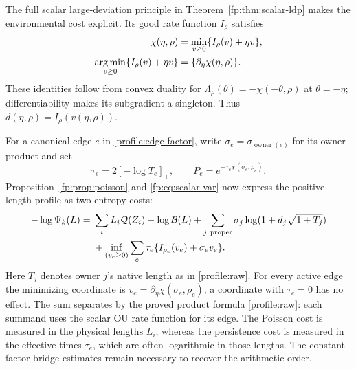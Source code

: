 The full scalar large-deviation principle in
Theorem~\ref{fp:thm:scalar-ldp} makes the environmental cost explicit.
Its good rate function $I_\rho$ satisfies
\begin{equation}\label{fp:eq:scalar-var}
 \begin{split}
 \chi(\eta,\rho)&=\min_{v\ge0}\{I_\rho(v)+\eta v\},\\
 \operatorname*{arg\,min}_{v\ge0}\{I_\rho(v)+\eta v\}
   &=\{\partial_\eta\chi(\eta,\rho)\}.
 \end{split}
\end{equation}
These identities follow from convex duality for
$\Lambda_\rho(\theta)=-\chi(-\theta,\rho)$ at $\theta=-\eta$;
differentiability makes its subgradient a singleton. Thus
$d(\eta,\rho)=I_\rho(v(\eta,\rho))$.

For a canonical edge $e$ in \eqref{profile:edge-factor}, write
$\sigma_e=\sigma_{\operatorname{owner}(e)}$ for its owner product and set
\begin{equation}\label{fp:eq:edge-clock}
 \tau_e=2[-\log T_e]_+,\qquad
 P_e=e^{-\tau_e\chi(\sigma_e,\rho_e)}.
\end{equation}
Proposition~\ref{fp:prop:poisson} and \eqref{fp:eq:scalar-var} now
express the positive-length profile as two entropy costs:
\begin{align}\label{fp:eq:profile-var}
 -\log\Psi_k(L)
 ={}&\sum_iL_i\mathcal Q(Z_i)-\log\mathcal B(L)
       +\sum_{j\ \mathrm{proper}}
          \sigma_j\log(1+d_j\sqrt{1+T_j})\notag\\
 &+\inf_{(v_e\ge0)}\sum_e\tau_e
             \{I_{\rho_e}(v_e)+\sigma_ev_e\}.
\end{align}
Here $T_j$ denotes owner $j$'s native length as in
\eqref{profile:raw}. For every active edge the minimizing coordinate is
$v_e=\partial_\eta\chi(\sigma_e,\rho_e)$; a coordinate with
$\tau_e=0$ has no effect. The sum separates by the proved product
formula \eqref{profile:raw}: each summand uses the scalar OU rate
function for its edge.
The Poisson cost is measured in the physical lengths $L_i$, whereas
the persistence cost is measured in the effective times $\tau_e$,
which are often logarithmic in those lengths. The constant-factor
bridge estimates remain necessary to recover the arithmetic order.

